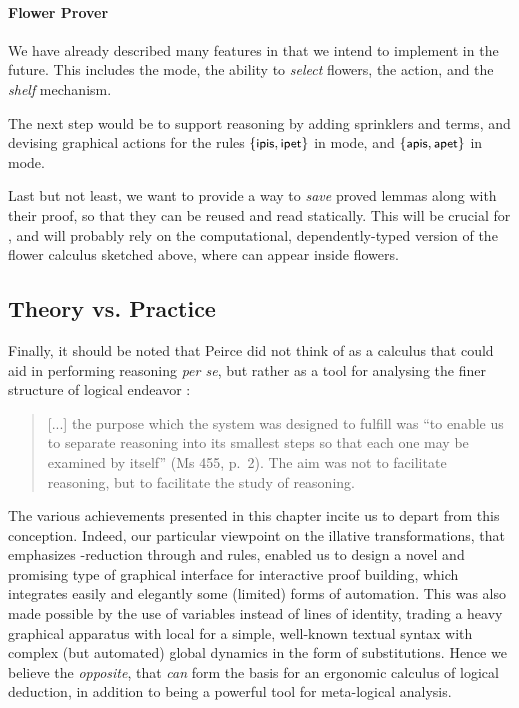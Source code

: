 \paragraph{Flower Prover}

We have already described many features in  that we
intend to implement in the future. This includes the \Navigation mode, the
ability to \emph{select} flowers, the  \Proof action, and the
\emph{shelf} mechanism.

The next step would be to support  reasoning by adding sprinklers and
 terms, and devising graphical actions for the rules $\{\text{\small$\mathsf{ipis}$},
\text{\small$\mathsf{ipet}$}\}$ in \Proof mode, and $\{\text{\small$\mathsf{apis}$}, \text{\small$\mathsf{apet}$}\}$ in \Edit mode.

Last but not least, we want to provide a way to \emph{save} proved lemmas along
with their proof, so that they can be reused and read statically. This will be
crucial for \emph{}, and will probably rely on the computational,
dependently-typed version of the flower calculus sketched above, where  can appear inside flowers.

\subsection{Theory vs. Practice}

Finally, it should be noted that Peirce did not think of  as a calculus that
could aid in performing reasoning \emph{per se}, but rather as a tool for
analysing the finer structure of logical endeavor
\cite[pp.~110--111]{Roberts+1973}:
\begin{quote}
  [...] the purpose which the system was designed to fulfill was ``to enable us
to separate reasoning into its smallest steps so that each one may be examined
by itself'' (Ms 455, p.~2). The aim was not to facilitate reasoning, but to
facilitate the study of reasoning.
\end{quote}

The various achievements presented in this chapter incite us to depart from this
conception. Indeed, our particular viewpoint on the illative transformations,
that emphasizes -reduction through  and  rules, enabled us
to design a novel and promising type of graphical interface for interactive
proof building, which integrates easily and elegantly some (limited) forms of
automation. This was also made possible by the use of variables instead of lines
of identity, trading a heavy graphical apparatus with local  for
a simple, well-known textual syntax with complex (but automated) global dynamics
in the form of substitutions. Hence we believe the \emph{opposite}, that 
\emph{can} form the basis for an ergonomic calculus of logical deduction, in
addition to being a powerful tool for meta-logical analysis.